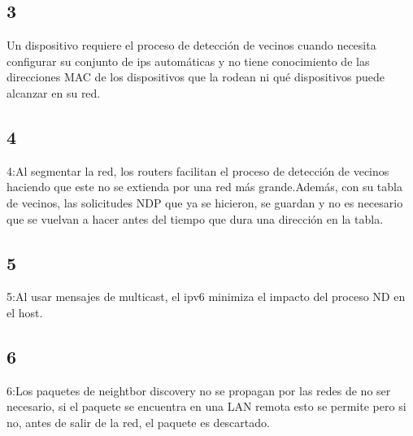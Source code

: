 \documentclass[]{article}
\begin{document}
	\subsection{\textbf{3}}
	
	Un dispositivo requiere el proceso de detección de vecinos cuando necesita configurar su conjunto de ips automáticas y no tiene conocimiento de las direcciones MAC de los dispositivos que la rodean ni qué dispositivos puede alcanzar en su red.
	
	\subsection{\textbf{4}}
	
	4:Al segmentar la red, los routers facilitan el proceso de detección de vecinos haciendo que este no se extienda por una red más grande.Además, con su tabla de vecinos, las solicitudes NDP que ya se hicieron, se guardan y no es necesario que se vuelvan a hacer antes del tiempo que dura una dirección en la tabla.
	
	\subsection{\textbf{5}}
	
	5:Al usar mensajes de multicast, el ipv6 minimiza el impacto del proceso ND en el host.
	
	\subsection{\textbf{6}}
	
	6:Los paquetes de neightbor discovery no se propagan por las redes de no ser necesario, si el paquete se encuentra en una LAN remota esto se permite pero si no, antes de salir de la red, el paquete es descartado.
	
	
\end{document}
